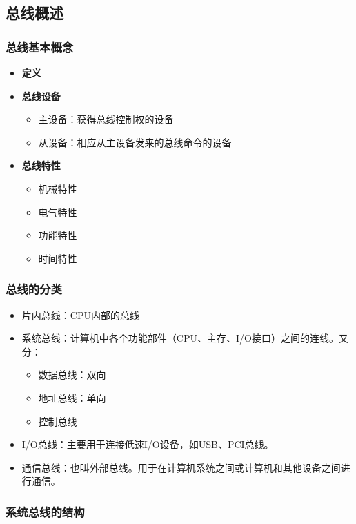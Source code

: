 \documentclass[12pt, a4paper, oneside]{ctexart}
\begin{document}
\subsection{总线概述}

\subsubsection{总线基本概念}

\begin{itemize}
  \item {\bf 定义}
  \item {\bf 总线设备}
  \begin{itemize}
    \item 主设备：获得总线控制权的设备
    \item 从设备：相应从主设备发来的总线命令的设备
  \end{itemize}
  \item {\bf 总线特性}
  \begin{itemize}
    \item 机械特性
    \item 电气特性
    \item 功能特性
    \item 时间特性
  \end{itemize}
\end{itemize}

\subsubsection{总线的分类}

\begin{itemize}
  \item 片内总线：CPU内部的总线
  \item 系统总线：计算机中各个功能部件（CPU、主存、I/O接口）之间的连线。又分：
  \begin{itemize}
    \item 数据总线：双向
    \item 地址总线：单向
    \item 控制总线
  \end{itemize}
  \item I/O总线：主要用于连接低速I/O设备，如USB、PCI总线。
  \item 通信总线：也叫外部总线。用于在计算机系统之间或计算机和其他设备之间进行通信。
\end{itemize}

\subsubsection{系统总线的结构}
\end{document}
